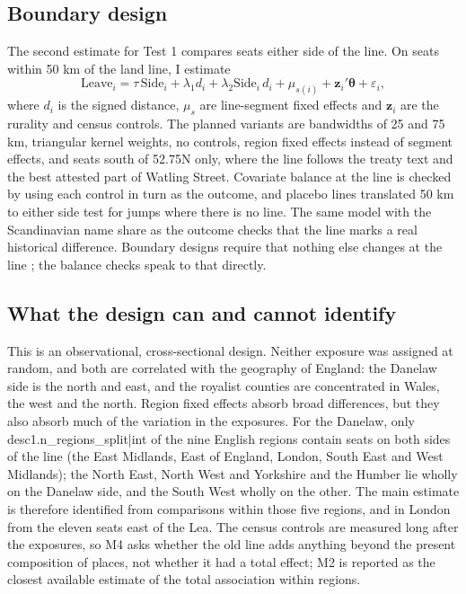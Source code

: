 \documentclass[11pt,a4paper]{article}
\begin{document}
\subsection{Boundary design}
The second estimate for Test 1 compares seats either side of the line. On seats within 50 km of the land line, I estimate
\begin{equation}
\text{Leave}_i = \tau\,\text{Side}_i + \lambda_1 d_i + \lambda_2 \text{Side}_i\, d_i + \mu_{s(i)} + \mathbf{z}_i'\boldsymbol\theta + \varepsilon_i,
\end{equation}
where $d_i$ is the signed distance, $\mu_s$ are line-segment fixed effects and $\mathbf{z}_i$ are the rurality and census controls. The planned variants are bandwidths of 25 and 75 km, triangular kernel weights, no controls, region fixed effects instead of segment effects, and seats south of 52.75\textdegree{}N only, where the line follows the treaty text and the best attested part of Watling Street. Covariate balance at the line is checked by using each control in turn as the outcome, and placebo lines translated 50 km to either side test for jumps where there is no line. The same model with the Scandinavian name share as the outcome checks that the line marks a real historical difference. Boundary designs require that nothing else changes at the line \citep{eggers2015}; the balance checks speak to that directly.

\subsection{What the design can and cannot identify}
This is an observational, cross-sectional design. Neither exposure was assigned at random, and both are correlated with the geography of England: the Danelaw side is the north and east, and the royalist counties are concentrated in Wales, the west and the north. Region fixed effects absorb broad differences, but they also absorb much of the variation in the exposures. For the Danelaw, only {{desc1.n_regions_split|int}} of the nine English regions contain seats on both sides of the line (the East Midlands, East of England, London, South East and West Midlands); the North East, North West and Yorkshire and the Humber lie wholly on the Danelaw side, and the South West wholly on the other. The main estimate is therefore identified from comparisons within those five regions, and in London from the eleven seats east of the Lea. The census controls are measured long after the exposures, so M4 asks whether the old line adds anything beyond the present composition of places, not whether it had a total effect; M2 is reported as the closest available estimate of the total association within regions.
\end{document}
